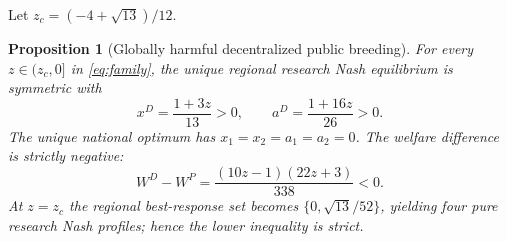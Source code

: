 \documentclass[11pt,a4paper]{article}
\newtheorem{proposition}{Proposition}
\begin{document}
Let $z_c=(-4+\sqrt{13})/12$.

\begin{proposition}[Globally harmful decentralized public breeding]
For every $z\in(z_c,0]$ in \eqref{eq:family}, the unique regional research Nash equilibrium is symmetric with
\begin{equation}
 x^D=\frac{1+3z}{13}>0,\qquad
 a^D=\frac{1+16z}{26}>0.
 \label{eq:p3nash}
\end{equation}
The unique national optimum has $x_1=x_2=a_1=a_2=0$. The welfare difference is strictly negative:
\begin{equation}
 W^D-W^P=\frac{(10z-1)(22z+3)}{338}<0.
 \label{eq:p3loss}
\end{equation}
At $z=z_c$ the regional best-response set becomes $\{0,\sqrt{13}/52\}$, yielding four pure research Nash profiles; hence the lower inequality is strict.
\end{proposition}
\end{document}
